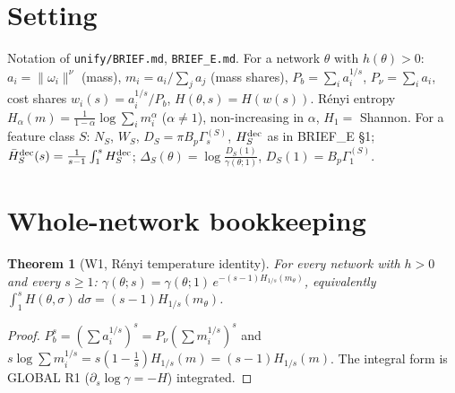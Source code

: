\documentclass[11pt]{article}
\newtheorem{theorem}{Theorem}\newtheorem{lemma}[theorem]{Lemma}\newtheorem{corollary}[theorem]{Corollary}
\theoremstyle{remark}\newtheorem{remark}[theorem]{Remark}
\newcommand{\Hr}{H_{1/s}}
\begin{document}
\section*{Setting}
Notation of \texttt{unify/BRIEF.md}, \texttt{BRIEF\_E.md}. For a network $\theta$ with $h(\theta)>0$:
$a_i=\|\omega_i\|^\nu$ (mass), $m_i=a_i/\sum_j a_j$ (mass shares), $P_b=\sum_i a_i^{1/s}$, $P_\nu=\sum_i a_i$,
cost shares $w_i(s)=a_i^{1/s}/P_b$, $H(\theta,s)=H(w(s))$. Rényi entropy $H_\alpha(m)=\frac1{1-\alpha}\log\sum_i m_i^\alpha$
($\alpha\ne1$), non-increasing in $\alpha$, $H_1=$ Shannon. For a feature class $S$: $N_S$, $W_S$, $D_S=\pi B_p\Gamma^{(S)}_s$,
$H^{\rm dec}_S$ as in BRIEF\_E \S1; $\bar H^{\rm dec}_S(s)=\frac1{s-1}\int_1^sH^{\rm dec}_S$; $\Delta_S(\theta)=\log\frac{D_S(1)}{\gamma(\theta;1)}$,
$D_S(1)=B_p\Gamma^{(S)}_1$.

\section{Whole-network bookkeeping}
\begin{theorem}[W1, Rényi temperature identity]\label{W1}
For every network with $h>0$ and every $s\ge1$:
$\gamma(\theta;s)=\gamma(\theta;1)\,e^{-(s-1)\Hr(m_\theta)}$, equivalently $\int_1^sH(\theta,\sigma)\,d\sigma=(s-1)\Hr(m_\theta)$.
\end{theorem}
\begin{proof}
$P_b^s=(\sum a_i^{1/s})^s=P_\nu(\sum m_i^{1/s})^s$ and $s\log\sum m_i^{1/s}=s(1-\tfrac1s)\Hr(m)=(s-1)\Hr(m)$. The integral form is
GLOBAL R1 ($\partial_s\log\gamma=-H$) integrated.
\end{proof}
\end{document}
